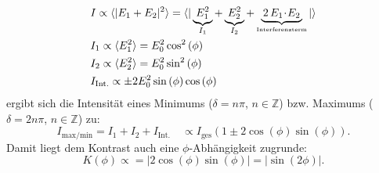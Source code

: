 \begin{align*}
	&	I 					 	\propto	 \langle |E_{1} + E_{2}|^2 \rangle = \langle |\underbrace{ \, E_{1}^2 \, }_{\substack{I_1}} + \underbrace{ \, E_{2}^2 \, }_{\substack{I_2}} + \underbrace{ \, 2 \, E_{1} \! \cdot \! E_{2} \, }_{\substack{\text{\tiny{Interferenzterm}}}} |\rangle \\
  	&	I_{1} 	\propto	 \langle E_1^2 \rangle = E_0^2  \cos^2{(\phi)}\\ %
	&	I_2 	\propto	 \langle E_2^2 \rangle = E_0^2  \sin^2{(\phi)} \\
	&	I_{\text{Int.}}	\propto	 \pm 2 E_0^2  \sin{(\phi)} \cos{(\phi)}\\
\end{align*}
ergibt sich die Intensität eines Minimums ($\delta = n \pi$, $n \in \mathbb{Z}$) bzw. Maximums ($\delta=2n\pi$, $n \in \mathbb{Z}$) zu:
\begin{equation*}
	I_{\text{max/min}} 	= I_1+I_2+I_{\text{Int.}} \quad \propto I_{\text{ges}} \left(1 \pm 2 \cos{(\phi)} \sin{(\phi)}\right).
	\label{eqn:intensity}
\end{equation*}
Damit liegt dem Kontrast auch eine $\phi$-Abhängigkeit zugrunde:
\begin{equation}
	K(\phi) \propto = | 2 \cos{(\phi)} \sin{(\phi)} | = |\sin{(2\phi)}|. %
	\label{eqn:kontrastmitwinkel}
\end{equation}

